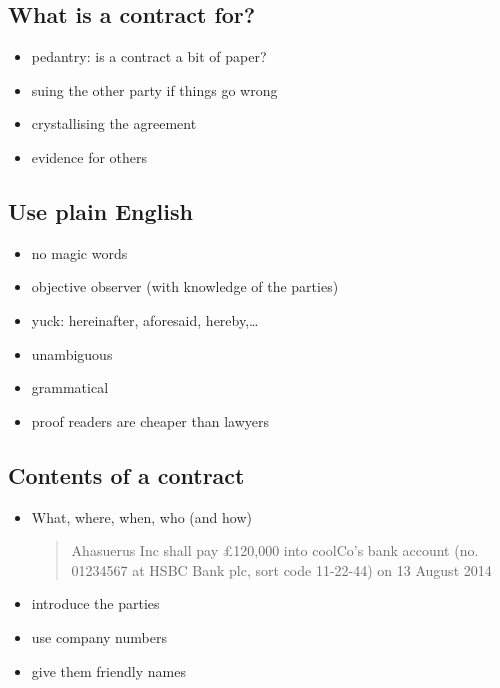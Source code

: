 \subsection{What is a contract for?}\label{what-is-a-contract-for}

\begin{itemize}
\itemsep1pt\parskip0pt
\item
  pedantry: is a contract a bit of paper?
\item
  suing the other party if things go wrong
\item
  crystallising the agreement
\item
  evidence for others
\end{itemize}

\subsection{Use plain English}\label{use-plain-english}

\begin{itemize}
\itemsep1pt\parskip0pt
\item
  no magic words
\item
  objective observer (with knowledge of the parties)
\item
  yuck: hereinafter, aforesaid, hereby,\ldots{}
\item
  unambiguous
\item
  grammatical
\item
  proof readers are cheaper than lawyers
\end{itemize}

\subsection{Contents of a contract}\label{contents-of-a-contract}

\begin{itemize}
\item
  What, where, when, who (and how)

  \begin{quote}
  Ahasuerus Inc shall pay £120,000 into coolCo's bank account (no.
  01234567 at HSBC Bank plc, sort code 11-22-44) on 13 August 2014
  \end{quote}
\item
  introduce the parties
\item
  use company numbers
\item
  give them friendly names
\end{itemize}


